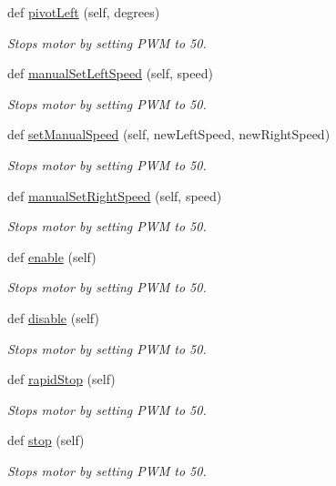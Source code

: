 \begin{DoxyCompactItemize}
def \hyperlink{classDriveControl_1_1DriveControl_a4a5762f08ec16832612e186149e124de}{pivot\+Left} (self, degrees)
\begin{DoxyCompactList}\small\item\em Stops motor by setting P\+WM to 50. \end{DoxyCompactList}\item 
def \hyperlink{classDriveControl_1_1DriveControl_a9c69343ba41e89f227bbf8e6681de2c0}{manual\+Set\+Left\+Speed} (self, speed)
\begin{DoxyCompactList}\small\item\em Stops motor by setting P\+WM to 50. \end{DoxyCompactList}\item 
def \hyperlink{classDriveControl_1_1DriveControl_a3077cc4bce48f0c1996f6ac2f4c5b40c}{set\+Manual\+Speed} (self, new\+Left\+Speed, new\+Right\+Speed)
\begin{DoxyCompactList}\small\item\em Stops motor by setting P\+WM to 50. \end{DoxyCompactList}\item 
def \hyperlink{classDriveControl_1_1DriveControl_a418d77b55117f63f058e63345e9e0035}{manual\+Set\+Right\+Speed} (self, speed)
\begin{DoxyCompactList}\small\item\em Stops motor by setting P\+WM to 50. \end{DoxyCompactList}\item 
def \hyperlink{classDriveControl_1_1DriveControl_ad7d5e7245c9d927a9b6be5ac2e0bc70b}{enable} (self)
\begin{DoxyCompactList}\small\item\em Stops motor by setting P\+WM to 50. \end{DoxyCompactList}\item 
def \hyperlink{classDriveControl_1_1DriveControl_a7c939f2b1577b6e05a176ef7ef40aa14}{disable} (self)
\begin{DoxyCompactList}\small\item\em Stops motor by setting P\+WM to 50. \end{DoxyCompactList}\item 
def \hyperlink{classDriveControl_1_1DriveControl_ab6b666f6baba403c6eab6c31eea78dc3}{rapid\+Stop} (self)
\begin{DoxyCompactList}\small\item\em Stops motor by setting P\+WM to 50. \end{DoxyCompactList}\item 
def \hyperlink{classDriveControl_1_1DriveControl_a51225e6485e533a32f7fbf1a020e4d38}{stop} (self)
\begin{DoxyCompactList}\small\item\em Stops motor by setting P\+WM to 50. \end{DoxyCompactList}\end{DoxyCompactItemize}

